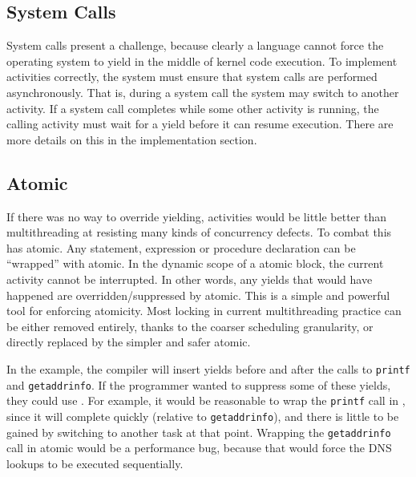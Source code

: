 \documentclass[9pt,preprint]{sigplanconf}
\begin{document}

\subsection{System Calls}

System calls present a challenge, because clearly a language cannot force the operating system to yield in the middle of kernel code execution.
To implement activities correctly, the system must ensure that system calls are performed asynchronously.
That is, during a system call the system may switch to another activity.
If a system call completes while some other activity is running, the calling activity must wait for a yield before it can resume execution.
There are more details on this in the implementation section.

\subsection{Atomic}
\label{sec:atomic}

If there was no way to override yielding, activities would be little better than multithreading at resisting many kinds of concurrency defects.
To combat this \charcoal{} has atomic.
Any statement, expression or procedure declaration can be ``wrapped'' with atomic.
In the dynamic scope of a atomic block, the current activity cannot be interrupted.
In other words, any yields that would have happened are overridden/suppressed by atomic.
This is a simple and powerful tool for enforcing atomicity.
Most locking in current multithreading practice can be either removed entirely, thanks to the coarser scheduling granularity, or directly replaced by the simpler and safer atomic.

In the example, the compiler will insert yields before and after the calls to \texttt{printf} and \texttt{getaddrinfo}.
If the programmer wanted to suppress some of these yields, they could use \atomic{}.
For example, it would be reasonable to wrap the \texttt{printf} call in \atomic{}, since it will complete quickly (relative to \texttt{getaddrinfo}), and there is little to be gained by switching to another task at that point.
Wrapping the \texttt{getaddrinfo} call in atomic would be a performance bug, because that would force the DNS lookups to be executed sequentially.
\end{document}
